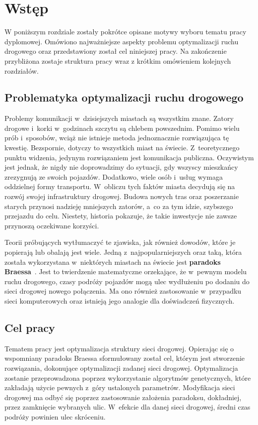 \documentclass[twoside,12pt]{report}
\let\oldsection\chapter
\def\chapter{\cleardoublepage\oldsection}
\begin{document}


\tableofcontents	%

\chapter{Wstęp}\label{rozdz.wstep} 

W poniższym rozdziale zostały pokrótce opisane motywy wyboru tematu pracy dyplomowej. Omówiono najważniejsze aspekty problemu optymalizacji ruchu drogowego oraz przedstawiony został cel niniejszej pracy. Na zakończenie przybliżona zostaje struktura pracy wraz z krótkim omówieniem kolejnych rozdziałów.

\section{Problematyka optymalizacji ruchu drogowego}
Problemy komunikacji w~dzisiejszych miastach są wszystkim znane. Zatory drogowe i~korki w~godzinach szczytu są chlebem powszednim. Pomimo wielu prób i~sposobów, wciąż nie istnieje metoda jednoznacznie rozwiązująca tę kwestię. Bezspornie, dotyczy to wszystkich miast na świecie. Z~teoretycznego punktu widzenia, jedynym rozwiązaniem jest komunikacja publiczna. Oczywistym jest jednak, że nigdy nie doprowadzimy do sytuacji, gdy wszyscy mieszkańcy zrezygnują ze swoich pojazdów. Dodatkowo, wiele osób i~usług wymaga oddzielnej formy transportu. W~obliczu tych faktów miasta decydują się na rozwój swojej infrastruktury drogowej. Budowa nowych tras oraz poszerzanie starych przynosi nadzieję mniejszych zatorów, a~co za tym idzie, szybszego przejazdu do celu. Niestety, historia pokazuje, że takie inwestycje nie zawsze przynoszą oczekiwane korzyści.

Teorii próbujących wytłumaczyć te zjawiska, jak również dowodów, które je popierają lub obalają jest wiele. Jedną z~najpopularniejszych oraz taką, która została wykorzystana w~niektórych miastach na świecie jest \textbf{paradoks Braessa}~\cite{braess}. Jest to twierdzenie matematyczne orzekające, że w~pewnym modelu ruchu drogowego, czasy podróży pojazdów mogą ulec wydłużeniu po dodaniu do sieci drogowej nowego połączenia. Ma ono również  zastosowanie w~przypadku  sieci komputerowych oraz istnieją jego analogie dla doświadczeń fizycznych.

\section{Cel pracy}
Tematem pracy jest optymalizacja struktury sieci drogowej. Opierając się o wspomniany paradoks Braessa sformułowany został cel, którym jest stworzenie rozwiązania, dokonujące optymalizacji zadanej sieci drogowej. Optymalizacja zostanie przeprowadzona poprzez wykorzystanie algorytmów genetycznych, które zakładają użycie pewnych z~góry ustalonych parametrów. Modyfikacja sieci drogowej ma odbyć się poprzez zastosowanie założenia paradoksu, dokładniej, przez zamknięcie wybranych ulic.  W~efekcie dla danej sieci drogowej, średni czas podróży powinien ulec skróceniu.
\end{document}
